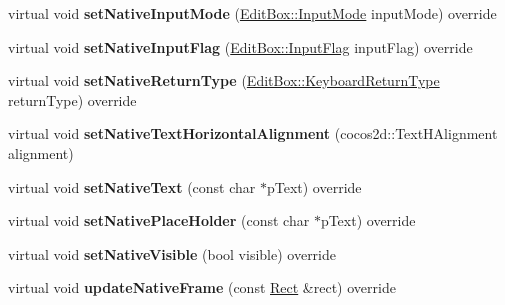 \begin{DoxyCompactItemize}
\item 
\mbox{\label{classui_1_1EditBoxImplLinux_a4aee0282f3087467c90df15a7dd72450}} 
virtual void {\bfseries set\+Native\+Input\+Mode} (\hyperlink{classui_1_1EditBox_a7a1bfe8f3ba218bedfcf5451ec3ce01a}{Edit\+Box\+::\+Input\+Mode} input\+Mode) override
\item 
\mbox{\label{classui_1_1EditBoxImplLinux_ae2d8e8889f62965eb05185b804bf2b3f}} 
virtual void {\bfseries set\+Native\+Input\+Flag} (\hyperlink{classui_1_1EditBox_af02f13ee9fba51d59bb3111e200848c8}{Edit\+Box\+::\+Input\+Flag} input\+Flag) override
\item 
\mbox{\label{classui_1_1EditBoxImplLinux_aed1c215ff0839ee4d81d9d47a6267ece}} 
virtual void {\bfseries set\+Native\+Return\+Type} (\hyperlink{classui_1_1EditBox_a1e1285b6f742975b26bdeb8108ca6e51}{Edit\+Box\+::\+Keyboard\+Return\+Type} return\+Type) override
\item 
\mbox{\label{classui_1_1EditBoxImplLinux_a6257d5fcdd68c6ed756bf0a243df8737}} 
virtual void {\bfseries set\+Native\+Text\+Horizontal\+Alignment} (cocos2d\+::\+Text\+H\+Alignment alignment)
\item 
\mbox{\label{classui_1_1EditBoxImplLinux_a2a2ad6bd9afbc32c8bba069fb02c00a0}} 
virtual void {\bfseries set\+Native\+Text} (const char $\ast$p\+Text) override
\item 
\mbox{\label{classui_1_1EditBoxImplLinux_ae851854bcb74f8701fd1eb07eb8f91f8}} 
virtual void {\bfseries set\+Native\+Place\+Holder} (const char $\ast$p\+Text) override
\item 
\mbox{\label{classui_1_1EditBoxImplLinux_ad944f0e6374796ba2dd31af272636e11}} 
virtual void {\bfseries set\+Native\+Visible} (bool visible) override
\item 
\mbox{\label{classui_1_1EditBoxImplLinux_ab1fec8d254ef3c0ff2d2bbc6988dc58b}} 
virtual void {\bfseries update\+Native\+Frame} (const \hyperlink{classRect}{Rect} \&rect) override
\item 

\end{DoxyCompactItemize}
